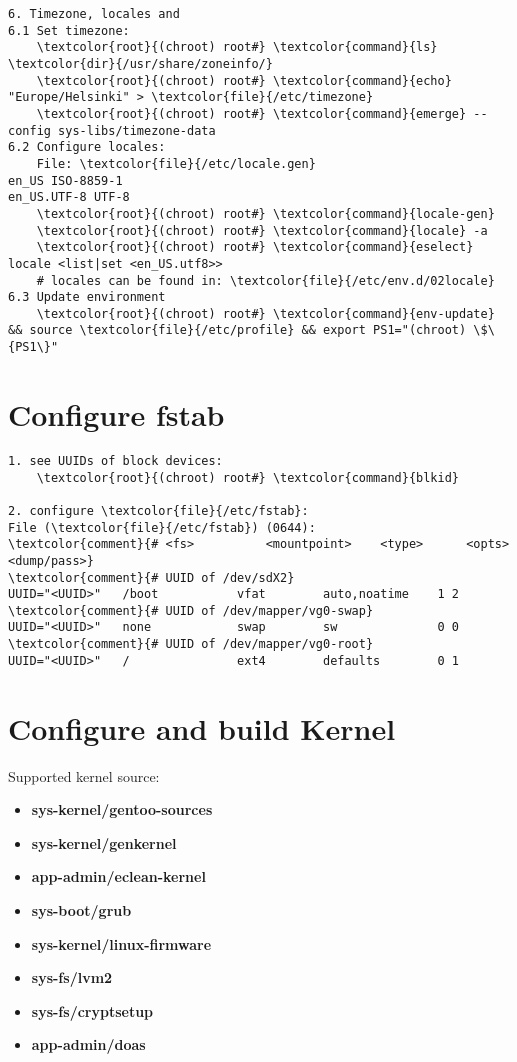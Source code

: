 \documentclass[10pt, a4paper, onecolumn, openany]{book}         %
\begin{document}
\begin{Verbatim}[commandchars=\\\{\}]
6. Timezone, locales and 
6.1 Set timezone:
    \textcolor{root}{(chroot) root#} \textcolor{command}{ls} \textcolor{dir}{/usr/share/zoneinfo/}
    \textcolor{root}{(chroot) root#} \textcolor{command}{echo} "Europe/Helsinki" > \textcolor{file}{/etc/timezone}
    \textcolor{root}{(chroot) root#} \textcolor{command}{emerge} --config sys-libs/timezone-data
6.2 Configure locales:
    File: \textcolor{file}{/etc/locale.gen}
en_US ISO-8859-1
en_US.UTF-8 UTF-8
    \textcolor{root}{(chroot) root#} \textcolor{command}{locale-gen}
    \textcolor{root}{(chroot) root#} \textcolor{command}{locale} -a
    \textcolor{root}{(chroot) root#} \textcolor{command}{eselect} locale <list|set <en_US.utf8>>
    # locales can be found in: \textcolor{file}{/etc/env.d/02locale}
6.3 Update environment
    \textcolor{root}{(chroot) root#} \textcolor{command}{env-update} && source \textcolor{file}{/etc/profile} && export PS1="(chroot) \$\{PS1\}"
\end{Verbatim}

\section{Configure fstab}
\begin{Verbatim}[commandchars=\\\{\}]
1. see UUIDs of block devices:
    \textcolor{root}{(chroot) root#} \textcolor{command}{blkid}

2. configure \textcolor{file}{/etc/fstab}:
File (\textcolor{file}{/etc/fstab}) (0644):
\textcolor{comment}{# <fs>          <mountpoint>    <type>      <opts>          <dump/pass>}
\textcolor{comment}{# UUID of /dev/sdX2}
UUID="<UUID>"   /boot           vfat        auto,noatime    1 2
\textcolor{comment}{# UUID of /dev/mapper/vg0-swap}
UUID="<UUID>"   none            swap        sw              0 0 
\textcolor{comment}{# UUID of /dev/mapper/vg0-root}
UUID="<UUID>"   /               ext4        defaults        0 1
\end{Verbatim}

\section{Configure and build Kernel}
Supported kernel source:
\begin{itemize}
    \item \textbf{sys-kernel/gentoo-sources}
    \item \textbf{sys-kernel/genkernel}
    \item \textbf{app-admin/eclean-kernel}
    \item \textbf{sys-boot/grub}
    \item \textbf{sys-kernel/linux-firmware}
    \item \textbf{sys-fs/lvm2}
    \item \textbf{sys-fs/cryptsetup}
    \item \textbf{app-admin/doas}
\end{itemize}
\end{document}
